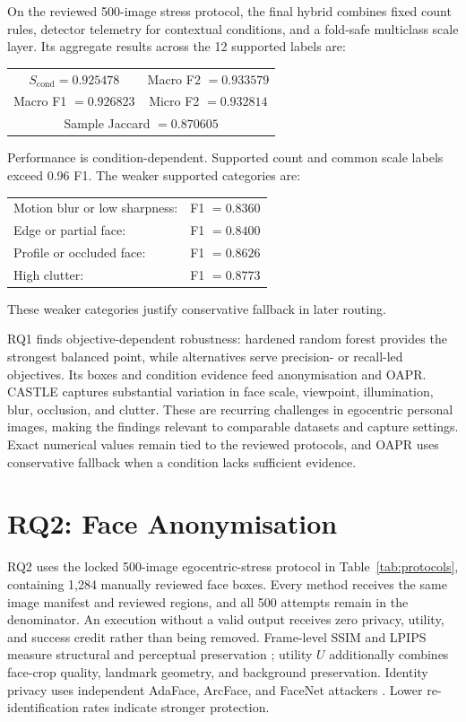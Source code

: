 \documentclass[10pt,twocolumn]{IEEEtran}
\begin{document}
On the reviewed 500-image stress protocol, the final hybrid combines fixed
count rules, detector telemetry for contextual conditions, and a fold-safe
multiclass scale layer. Its aggregate results across the 12 supported labels
are:
\begin{center}
\footnotesize
\begin{tabular}{@{}cc@{}}
$S_{\mathrm{cond}}=0.925478$ & Macro F2 $=0.933579$ \\
Macro F1 $=0.926823$ & Micro F2 $=0.932814$ \\
\multicolumn{2}{c}{Sample Jaccard $=0.870605$}
\end{tabular}
\end{center}
Performance is condition-dependent. Supported count and common scale
labels exceed 0.96 F1. The weaker supported categories are:
\begin{center}
\footnotesize
\begin{tabular}{@{}ll@{}}
Motion blur or low sharpness: & F1 $=0.8360$ \\
Edge or partial face: & F1 $=0.8400$ \\
Profile or occluded face: & F1 $=0.8626$ \\
High clutter: & F1 $=0.8773$
\end{tabular}
\end{center}
These weaker categories justify conservative fallback in later routing.

RQ1 finds objective-dependent robustness: hardened random forest provides the
strongest balanced point, while alternatives serve precision- or recall-led
objectives. Its boxes and condition evidence feed anonymisation and OAPR.
CASTLE captures substantial variation in face scale, viewpoint, illumination,
blur, occlusion, and clutter. These are recurring challenges in egocentric
personal images, making the findings relevant to comparable datasets and
capture settings. Exact numerical values remain tied to the reviewed protocols,
and OAPR uses conservative fallback when a condition lacks sufficient evidence.

\clearpage

\section{RQ2: Face Anonymisation}
\label{sec:rq2}

RQ2 uses the locked 500-image egocentric-stress protocol in
Table~\ref{tab:protocols}, containing 1,284 manually reviewed face boxes. Every
method receives the same image manifest and reviewed regions, and all 500
attempts remain in the denominator. An execution without a valid output receives
zero privacy, utility, and success credit rather than being removed. Frame-level
SSIM and LPIPS measure structural and perceptual preservation
\cite{wang2004ssim,zhang2018lpips}; utility $U$ additionally combines face-crop
quality, landmark geometry, and background preservation. Identity privacy uses
independent AdaFace, ArcFace, and FaceNet attackers
\cite{kim2022adaface,deng2019arcface,schroff2015facenet}. Lower re-identification
rates indicate stronger protection.
\end{document}
